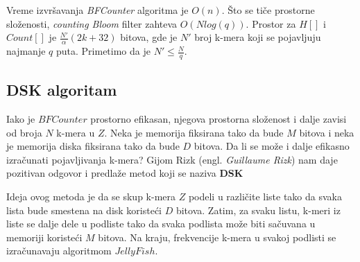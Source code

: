 \documentclass[12pt,oneside]{memoir}
\begin{document}
Vreme izvršavanja \textit{BFCounter} algoritma je $O(n)$. Što se tiče prostorne složenosti, \textit{counting Bloom} filter zahteva $O(N log(q))$. Prostor za $H[]$ i $Count[]$ je $\frac{N'}{\alpha}(2k + 32)$ bitova, gde je $N'$ broj k-mera koji se pojavljuju najmanje $q$ puta. Primetimo da je $N' \leq \frac{N}{q}$.

\newpage

\subsection{DSK algoritam}
Iako je $BFCounter$ prostorno efikasan, njegova prostorna složenost i dalje zavisi od broja $N$ k-mera u $Z$. Neka je memorija fiksirana tako da bude $M$ bitova i neka je memorija diska fiksirana tako da bude $D$ bitova. Da li se može i dalje efikasno izračunati pojavljivanja k-mera? Gijom Rizk (engl. \textit{Guillaume Rizk}) nam daje pozitivan odgovor i predlaže metod koji se naziva \textbf{DSK}

\begin{comment}

, a čiji pseudokod je prikazan na slici \ref{fig:63}:

\begin{figure}[h]
\centering
\texttt{[image: DSK5\_11.PNG]}
\caption{DSK algoritam}
\label{fig:63}
\source{\cite{WingKinSung} str. 136, slika 5.11}
\end{figure}

\end{comment}

Ideja ovog metoda je da se skup k-mera $Z$ podeli u različite liste tako da svaka lista bude smestena na disk koristeći $D$ bitova. Zatim, za svaku listu, k-meri iz liste se dalje dele u podliste tako da svaka podlista može biti sačuvana u memoriji koristeći $M$ bitova. Na kraju, frekvencije k-mera u svakoj podlisti se izračunavaju algoritmom $JellyFish$.
\end{document}
